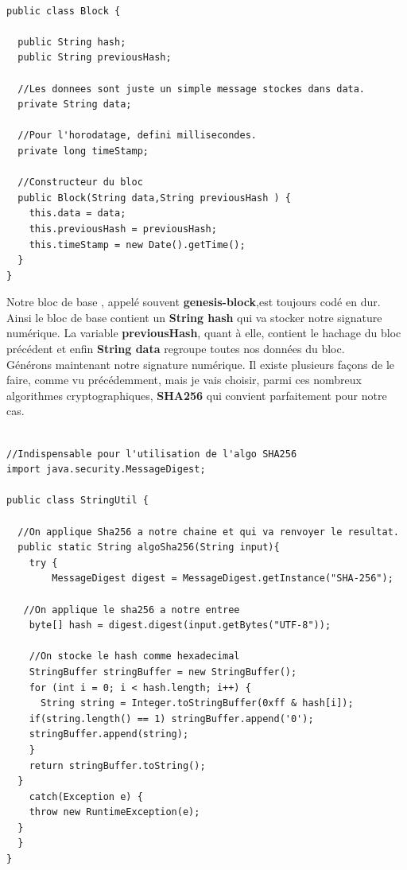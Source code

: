 \documentclass[12pt]{report}
\begin{document}
\begin{lstlisting}

public class Block {

  public String hash;
  public String previousHash;
  
  //Les donnees sont juste un simple message stockes dans data.
  private String data; 
  
  //Pour l'horodatage, defini millisecondes.
  private long timeStamp;

  //Constructeur du bloc
  public Block(String data,String previousHash ) {
    this.data = data;
    this.previousHash = previousHash;
    this.timeStamp = new Date().getTime();
  }
}

\end{lstlisting}

Notre bloc de base , appelé souvent \textbf{genesis-block},est toujours codé en dur. Ainsi le bloc de base  contient un \textbf{String hash} qui va stocker notre signature numérique. La variable \textbf{previousHash}, quant à elle, contient le hachage du bloc précédent et enfin \textbf{String data} regroupe toutes nos données du bloc.\\

Générons maintenant notre signature numérique. Il existe plusieurs façons de le faire, comme vu précédemment, mais je vais choisir, parmi ces nombreux algorithmes cryptographiques, \textbf{SHA256} qui convient parfaitement pour notre cas.

\begin{lstlisting}

//Indispensable pour l'utilisation de l'algo SHA256
import java.security.MessageDigest;

public class StringUtil {

  //On applique Sha256 a notre chaine et qui va renvoyer le resultat.
  public static String algoSha256(String input){    
    try {
        MessageDigest digest = MessageDigest.getInstance("SHA-256");
      
   //On applique le sha256 a notre entree 
    byte[] hash = digest.digest(input.getBytes("UTF-8"));   
    
    //On stocke le hash comme hexadecimal
    StringBuffer stringBuffer = new StringBuffer(); 
    for (int i = 0; i < hash.length; i++) {
      String string = Integer.toStringBuffer(0xff & hash[i]);
    if(string.length() == 1) stringBuffer.append('0');
    stringBuffer.append(string);
    }
    return stringBuffer.toString();
  }
    catch(Exception e) {
    throw new RuntimeException(e);
  }
  } 
}
\end{lstlisting}
\end{document}
